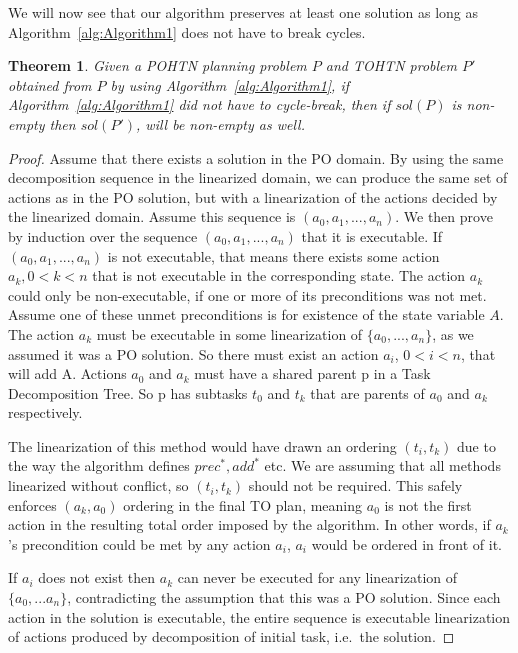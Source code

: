 \documentclass[letterpaper]{article}
\newtheorem{theorem}{Theorem}
\newtheorem{proof}{Proof}
\begin{document}
We will now see that our algorithm preserves at least one solution as long as Algorithm~\ref{alg:Algorithm1} does not have to break cycles.
\begin{theorem}\label{thm:SpecialCase}
	Given a POHTN planning problem $P$ and TOHTN problem
	$P'$ obtained from $P$ by using Algorithm~\ref{alg:Algorithm1}, if Algorithm~\ref{alg:Algorithm1} did not have to
	cycle-break, then if $sol(P)$ is non-empty then $sol(P')$, will be non-empty as well.
\end{theorem}
\begin{proof}
	Assume that there exists a solution in the PO domain. By using the same decomposition sequence in the linearized domain, we can produce the same set of actions as in the PO solution, but with a linearization of the actions decided by the linearized domain. Assume this sequence is $(a_0, a_1, ..., a_n)$. We then prove by induction over the sequence $(a_0, a_1, ..., a_n)$ that it is executable.
	If $(a_0, a_1, ..., a_n)$ is not executable, that means there exists some action $a_k,  0 < k < n$ that is not executable in the corresponding state. The action $a_k$ could only be non-executable, if one or more of its preconditions was not met. Assume one of these unmet preconditions is for existence of the state variable $A$.
	The action $a_k$ must be executable in some linearization of $\{a_0, ..., a_n\}$, as we assumed it was a PO solution. So there must exist an action $a_i$, $0 < i < n$, that will add A. Actions $a_0$ and $a_k$ must have a shared parent p in a Task Decomposition Tree. So p has subtasks $t_0$ and $t_k$ that are parents of $a_0$ and $a_k$ respectively. 
	
	The linearization of this method would have drawn an ordering $(t_i, t_k)$ due to the way the algorithm defines $prec^{*}, add^{*}$ etc. We are assuming that all methods linearized without conflict, so $(t_i, t_k)$ should not be required. This safely enforces $(a_k, a_0)$ ordering in the final TO plan, meaning $a_0$ is not the first action in the resulting total order imposed by the algorithm. In other words, if $a_k$’s precondition could be met by any action $a_i$, $a_i$ would be ordered in front of it. 
	
	If $a_i$ does not exist then $a_k$ can never be executed for any linearization of $\{a_0, ...a_n\}$, contradicting the assumption that this was a PO solution. Since each action in the solution is executable, the entire sequence is executable linearization of actions produced by decomposition of initial task, i.e.\ the solution.
\end{proof}
\end{document}
